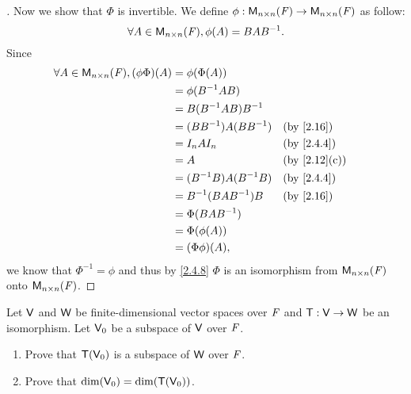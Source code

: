 \begin{proof}[]
  Now we show that \(\Phi\) is invertible.
  We define \(\phi : \mathsf{M}_{{n} \times n}({\mathit{F}}) \to \mathsf{M}_{{n} \times n}({\mathit{F}})\) as follow:
  \[
    \forall A \in \mathsf{M}_{{n} \times n}({\mathit{F}}), \phi(A) = BAB^{-1}.
  \]
  Since
  \begin{align*}
    \forall A \in \ms{n}{n}{\F}, (\phi \Phi)(A) & = \phi(\Phi(A))                                           \\
                                                & = \phi(B^{-1} AB)                                         \\
                                                & = B(B^{-1} AB) B^{-1}                                     \\
                                                & = (BB^{-1}) A (BB^{-1})   &  & \text{(by \cref{2.16})}    \\
                                                & = I_n A I_n               &  & \text{(by \cref{2.4.4})}   \\
                                                & = A                       &  & \text{(by \cref{2.12}(c))} \\
                                                & = (B^{-1} B) A (B^{-1} B) &  & \text{(by \cref{2.4.4})}   \\
                                                & = B^{-1} (BAB^{-1}) B     &  & \text{(by \cref{2.16})}    \\
                                                & = \Phi(BAB^{-1})                                          \\
                                                & = \Phi(\phi(A))                                           \\
                                                & = (\Phi \phi)(A),
  \end{align*}
  we know that \(\Phi^{-1} = \phi\) and thus by \cref{2.4.8} \(\Phi\) is an isomorphism from \(\mathsf{M}_{{n} \times n}({\mathit{F}})\) onto \(\mathsf{M}_{{n} \times n}({\mathit{F}})\).
\end{proof}

\begin{ex}\label{ex:2.4.17}
  Let \(\mathsf{V}\) and \(\mathsf{W}\) be finite-dimensional vector spaces over \(\mathit{F}\) and \(\mathsf{T} : \mathsf{V} \to \mathsf{W}\) be an isomorphism.
  Let \(\mathsf{V}_0\) be a subspace of \(\mathsf{V}\) over \(\mathit{F}\).
  \begin{enumerate}
    \item Prove that \(\mathsf{T}(\mathsf{V}_0)\) is a subspace of \(\mathsf{W}\) over \(\mathit{F}\).
    \item Prove that \(\dim(\mathsf{V}_0) = \dim(\mathsf{T}(\mathsf{V}_0))\).
  \end{enumerate}
\end{ex}

